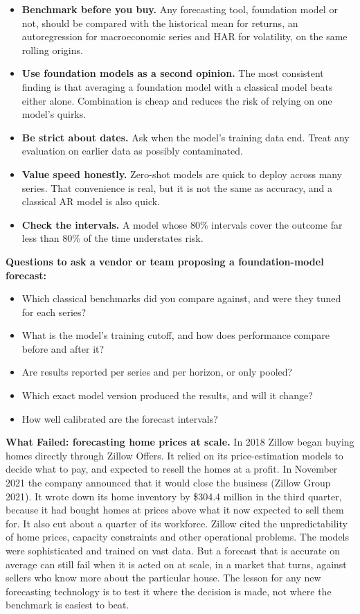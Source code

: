 \begin{itemize}
  \item \textbf{Benchmark before you buy.} Any forecasting tool, foundation model or not, should be compared with the historical mean for returns, an autoregression for macroeconomic series and HAR for volatility, on the same rolling origins.
  \item \textbf{Use foundation models as a second opinion.} The most consistent finding is that averaging a foundation model with a classical model beats either alone. Combination is cheap and reduces the risk of relying on one model's quirks.
  \item \textbf{Be strict about dates.} Ask when the model's training data end. Treat any evaluation on earlier data as possibly contaminated.
  \item \textbf{Value speed honestly.} Zero-shot models are quick to deploy across many series. That convenience is real, but it is not the same as accuracy, and a classical AR model is also quick.
  \item \textbf{Check the intervals.} A model whose 80\% intervals cover the outcome far less than 80\% of the time understates risk.
\end{itemize}

\textbf{Questions to ask a vendor or team proposing a foundation-model forecast:}

\begin{itemize}
  \item Which classical benchmarks did you compare against, and were they tuned for each series?
  \item What is the model's training cutoff, and how does performance compare before and after it?
  \item Are results reported per series and per horizon, or only pooled?
  \item Which exact model version produced the results, and will it change?
  \item How well calibrated are the forecast intervals?
\end{itemize}

\begin{callout}
\textbf{What Failed: forecasting home prices at scale.} In 2018 Zillow began buying homes directly through Zillow Offers. It relied on its price-estimation models to decide what to pay, and expected to resell the homes at a profit. In November 2021 the company announced that it would close the business (Zillow Group 2021). It wrote down its home inventory by \$304.4 million in the third quarter, because it had bought homes at prices above what it now expected to sell them for. It also cut about a quarter of its workforce. Zillow cited the unpredictability of home prices, capacity constraints and other operational problems. The models were sophisticated and trained on vast data. But a forecast that is accurate on average can still fail when it is acted on at scale, in a market that turns, against sellers who know more about the particular house. The lesson for any new forecasting technology is to test it where the decision is made, not where the benchmark is easiest to beat.
\end{callout}

